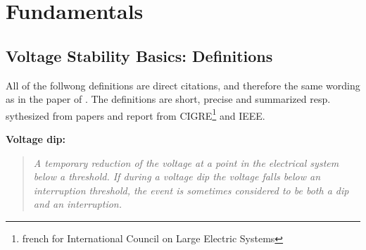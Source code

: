 
\label{app:appendix}


%  
%
%





\chapter{Fundamentals}

\section{Voltage Stability Basics: Definitions}
\label{app:voltage-stability-definitions}

All of the follwong definitions are direct citations, and therefore the same wording as in the paper of \textcite{shoup_2004}. 
The definitions are short, precise and summarized resp. sythesized from papers and report from \ac{CIGRE}\footnote{french for International Council on Large Electric Systems} and \ac{IEEE}.

\textbf{Voltage dip:}
\begin{quote}\itshape
    \glqq A temporary reduction of the voltage at a point in the electrical system below a threshold. 
    If during a voltage dip the voltage falls below an interruption threshold, the event is sometimes considered to be both a dip and an interruption.\grqq
\end{quote}

